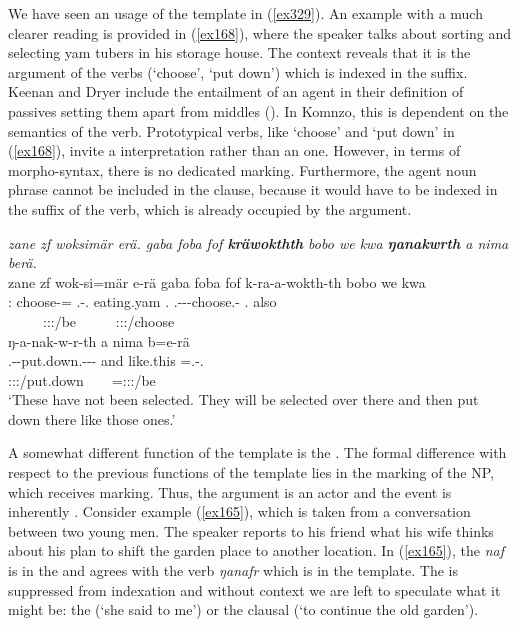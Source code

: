 We have seen an  usage of the  template in (\ref{ex329}). An example with a much clearer  reading is provided in (\ref{ex168}), where the speaker talks about sorting and selecting yam tubers in his storage house. The context reveals that it is the  argument of the verbs (`choose', `put down') which is indexed in the suffix. Keenan and Dryer include the entailment of an agent in their definition of passives setting them apart from middles (\citeyear[352]{Keenan:2007passives}). In Komnzo, this is dependent on the semantics of the verb. Prototypical  verbs, like `choose' and `put down' in (\ref{ex168}), invite a  interpretation rather than an  one. However, in terms of morpho-syntax, there is no dedicated  marking. Furthermore, the agent noun phrase cannot be included in the clause, because it would have to be indexed in the suffix of the verb, which is already occupied by the  argument.

\begin{exe}
	\ex \emph{zane zf woksimär erä. gaba foba fof \textbf{kräwokthth} bobo we kwa \textbf{ŋanakwrth} a nima berä.}\\
	\glll zane zf wok-si=mär e-rä gaba foba fof k-ra-a-wokth-th bobo we kwa\\
	\Dem:{\Prox} {\Imm} choose-\Nmlz={\Priv} \Stnsg.\Alph-\Cop.{\Ndu} {eating.yam} \Dist.{\Abl} {\Emph} \M.\Bet{}-\Irr-\Vc\textbar\Ndu-choose.\Rs-\Stnsg{} \Med.{\All} also {\Fut}\\
	~ ~ ~ {\footnotesize \Stpl:\Sbj:\Nonpast:\Ipfv/be} ~ ~ ~ {\footnotesize \Stpl:\Sbj:\Irr:\Pfv/choose} ~ ~ ~\\
	\sn
	\glll ŋ-a-nak-w-r-th a nima b=e-rä\\
	\M.\Alph-\Vc-put.down.\Ext-\Ndu-\Lk-\Stnsg{} and like.this \Med=\Stnsg.\Alph-\Cop.{\Ndu}\\
	{\footnotesize \Stpl:\Sbj:\Nonpast:\Ipfv/put.down} ~ ~ {\footnotesize \Med=\Stpl:\Sbj:\Nonpast:\Ipfv/be}\\
	\trans `These have not been selected. They will be selected over there and then put down there like those ones.' 
	\label{ex168}
\end{exe}

A somewhat different function of the  template is the  . The formal difference with respect to the previous functions of the  template lies in the marking of the NP, which receives  marking. Thus, the argument is an actor and the event is inherently . Consider example (\ref{ex165}), which is taken from a conversation between two young men. The speaker reports to his friend what his wife thinks about his plan to shift the garden place to another location. In (\ref{ex165}), the  \emph{naf} is in the   and agrees with the verb \emph{ŋanafr} which is in the  template. The  is suppressed from indexation and without context we are left to speculate what it might be: the  (`she said to me') or the clausal  (`to continue the old garden').

